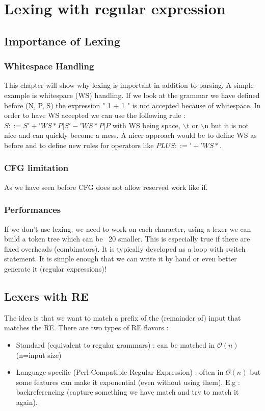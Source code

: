 \chapter{Lexing with regular expression}
\label{chap:lexing_regular_expr}

\section{Importance of Lexing}
    \subsection{Whitespace Handling}
        This chapter will show why lexing is important in addition to parsing. A
        simple example is whitespace (WS) handling. If we look at the grammar we
        have defined before (N, P, S) the expression " 1 + 1 " is not accepted
        because of whitespace. In order to have WS accepted we can use the
        following rule : $S ::= S '+' WS* P | S '-' WS* P | P$  with WS being
        space, $\backslash$t or $\backslash$n but it is not nice and can quickly
        become a mess. A nicer approach would be to define WS as before and to
        define new rules for operators like $PLUS ::= '+' WS*$.
    \subsection{CFG limitation}
        As we have seen before CFG does not allow reserved work like if.
    \subsection{Performances}
        If we don't use lexing, we need to work on each character, using a lexer
        we can build a token tree which can be ~20 smaller. This is especially
        true if there are fixed overheads (combinators). It is typically
        developed as a loop with switch statement. It is simple enough that we
        can write it by hand or even better generate it (regular expressions)!
\section{Lexers with RE}
    The idea is that we want to match a prefix of the (remainder of) input that
    matches the RE. There are two types of RE flavors : 
    \begin{itemize}
        \item Standard (equivalent to regular grammars) : can be matched in
        $\mathcal{O}(n)$ (n=input size)
        \item Language specific (Perl-Compatible Regular Expression) : often in
        $\mathcal{O}(n)$ but some features can make it exponential (even without
        using them). E.g : backreferencing (capture something we have match and
        try to match it again).
    \end{itemize}

